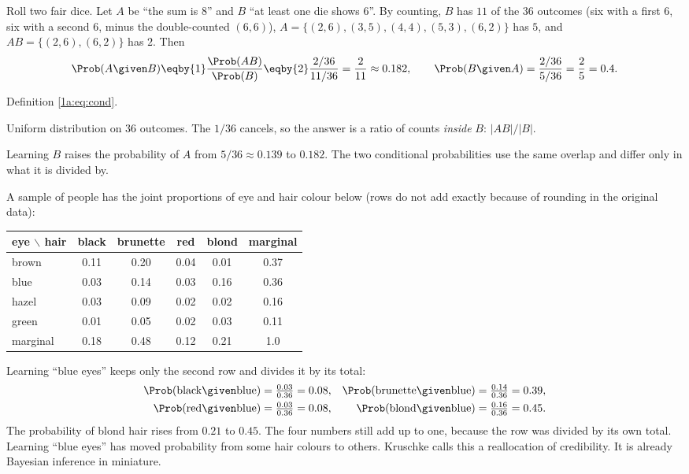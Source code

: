 \label{1a:ex:dice-cond}
Roll two fair dice. Let $A$ be ``the sum is 8'' and $B$ ``at least one die shows
6''. By counting, $B$ has $11$ of the $36$ outcomes (six with a first 6, six with a
second 6, minus the double-counted $(6,6)$), $A=\{(2,6),(3,5),(4,4),(5,3),(6,2)\}$ has
$5$, and $AB=\{(2,6),(6,2)\}$ has $2$. Then
\begin{align*}
\Prob(A\given B)\eqby{1}\frac{\Prob(AB)}{\Prob(B)}\eqby{2}\frac{2/36}{11/36}=\frac{2}{11}\approx0.182,
\qquad
\Prob(B\given A)=\frac{2/36}{5/36}=\frac25=0.4 .
\end{align*}
\begin{explain}
  \item Definition \eqref{1a:eq:cond}.
  \item Uniform distribution on $36$ outcomes. The $1/36$ cancels, so the answer is
        a ratio of counts \emph{inside} $B$: $|AB|/|B|$.
\end{explain}
Learning $B$ raises the probability of $A$ from $5/36\approx0.139$ to $0.182$. The
two conditional probabilities use the same overlap and differ only in what it
is divided by.

\label{1a:ex:hair-eye}
A sample of people has the joint proportions of eye and hair colour below
 (rows do not add exactly because of rounding in
the original data):
\begin{center}
\small
\begin{tabular}{@{}lccccc@{}}
\toprule
eye $\backslash$ hair & black & brunette & red & blond & marginal\\
\midrule
brown & 0.11 & 0.20 & 0.04 & 0.01 & 0.37\\
blue  & 0.03 & 0.14 & 0.03 & 0.16 & 0.36\\
hazel & 0.03 & 0.09 & 0.02 & 0.02 & 0.16\\
green & 0.01 & 0.05 & 0.02 & 0.03 & 0.11\\
\midrule
marginal & 0.18 & 0.48 & 0.12 & 0.21 & 1.0\\
\bottomrule
\end{tabular}
\end{center}
Learning ``blue eyes'' keeps only the second row and divides it by its total:
\begin{align*}
\Prob(\text{black}\given\text{blue})&=\tfrac{0.03}{0.36}=0.08, &
\Prob(\text{brunette}\given\text{blue})&=\tfrac{0.14}{0.36}=0.39,\\
\Prob(\text{red}\given\text{blue})&=\tfrac{0.03}{0.36}=0.08, &
\Prob(\text{blond}\given\text{blue})&=\tfrac{0.16}{0.36}=0.45 .
\end{align*}
The probability of blond hair rises from $0.21$ to $0.45$. The four numbers still
add up to one, because the row was divided by its own total. Learning ``blue
eyes'' has moved probability from some hair colours to others. Kruschke calls
this a reallocation of credibility. It is already Bayesian inference in
miniature.

